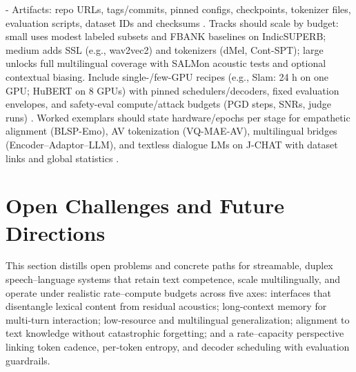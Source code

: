 \documentclass{article}
\begin{document}
- Artifacts: repo URLs, tags/commits, pinned configs, checkpoints, tokenizer files, evaluation scripts, dataset IDs and checksums \cite{sun2025llasofoundationalframeworkreproduciblere,vashishth2024stabspeechtokenizerassessmentbenchmark,maimon2025salmonsuiteacousticlanguagemodelevaluati}.
Tracks should scale by budget: small uses modest labeled subsets and FBANK baselines on IndicSUPERB; medium adds SSL (e.g., wav2vec2) and tokenizers (dMel, Cont-SPT); large unlocks full multilingual coverage with SALMon acoustic tests and optional contextual biasing. Include single-/few-GPU recipes (e.g., Slam: 24 h on one GPU; HuBERT on 8 GPUs) with pinned schedulers/decoders, fixed evaluation envelopes, and safety-eval compute/attack budgets (PGD steps, SNRs, judge runs) \cite{bai2025dmelspeechtokenizationmadesimple,li2025continuousspeechtokenizertext,maimon2025salmonsuiteacousticlanguagemodelevaluati,maimon2025slammingtrainingspeechlanguagemodelonegp,chen2023reducingbarriersselfsupervisedlearninghu,peri2024speechguardexploringadversarialrobustnes}. Worked exemplars should state hardware/epochs per stage for empathetic alignment (BLSP-Emo), AV tokenization (VQ-MAE-AV), multilingual bridges (Encoder–Adaptor–LLM), and textless dialogue LMs on J-CHAT with dataset links and global statistics \cite{wang2024blspemotowardsempatheticlargespeechlangu,sadok2025vectorquantizedmaskedautoencoderaudiovis,li2025seewossubmissionmlcslmlessonslearnedspee,nakata2024jchatjapaneselargescalespokendialoguecor}.

















\section{Open Challenges and Future Directions} \label{sec:Open Challenges and Future Directions}

This section distills open problems and concrete paths for streamable, duplex speech–language systems that retain text competence, scale multilingually, and operate under realistic rate–compute budgets across five axes: interfaces that disentangle lexical content from residual acoustics; long-context memory for multi‑turn interaction; low‑resource and multilingual generalization; alignment to text knowledge without catastrophic forgetting; and a rate–capacity perspective linking token cadence, per‑token entropy, and decoder scheduling with evaluation guardrails.
\end{document}

